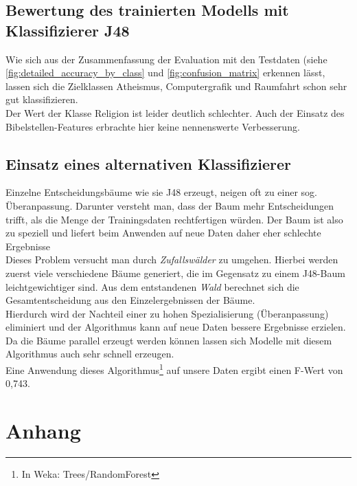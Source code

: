 \documentclass[
	11pt,
	a4paper
]{scrartcl}
\begin{document}
\subsection{Bewertung des trainierten Modells mit Klassifizierer J48}
Wie sich aus der Zusammenfassung der Evaluation mit den Testdaten (siehe \autoref{fig:detailed_accuracy_by_class} und
\autoref{fig:confusion_matrix} erkennen lässt, lassen sich die Zielklassen Atheismus, Computergrafik und Raumfahrt schon sehr gut
klassifizieren.\\
Der Wert der Klasse Religion ist leider deutlich schlechter. Auch der Einsatz des Bibelstellen-Features erbrachte hier keine nennenswerte
Verbesserung.

\subsection{Einsatz eines alternativen Klassifizierer}
Einzelne Entscheidungsbäume wie sie J48 erzeugt, neigen oft zu einer sog. Überanpassung. Darunter versteht man, dass der
Baum mehr Entscheidungen trifft, als die Menge der Trainingsdaten rechtfertigen würden. Der Baum ist also zu speziell und liefert beim
Anwenden auf neue Daten daher eher schlechte Ergebnisse\\

Dieses Problem versucht man durch \emph{Zufallswälder} zu umgehen. Hierbei werden zuerst viele verschiedene Bäume generiert, die im
Gegensatz zu einem J48-Baum leichtgewichtiger sind. Aus dem entstandenen \emph{Wald} berechnet sich die Gesamtentscheidung aus den
Einzelergebnissen der Bäume.\\
Hierdurch wird der Nachteil einer zu hohen Spezialisierung (Überanpassung) eliminiert und der
Algorithmus kann auf neue Daten bessere Ergebnisse erzielen.\\
Da die Bäume parallel erzeugt werden können lassen sich Modelle mit diesem Algorithmus auch sehr schnell erzeugen.\\

Eine Anwendung dieses Algorithmus\footnote{In Weka: Trees/RandomForest} auf unsere Daten ergibt einen F-Wert von 0,743.

\newpage
\section{Anhang}
\end{document}
